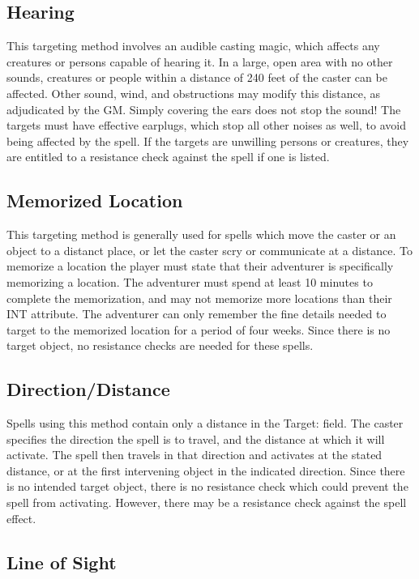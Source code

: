 \begin{multicols*}{2}
\subsection{Hearing}

This targeting method involves an audible casting magic, which affects any creatures or persons capable of hearing it. In a large, open area with no other sounds,  creatures or people within a distance of 240 feet of the caster can be affected. Other sound, wind, and obstructions may modify this distance, as adjudicated by the GM. Simply covering the ears does not stop the sound! The targets must have effective earplugs, which stop all other noises as well, to avoid being affected by the spell. If the targets are unwilling persons or creatures, they are entitled to a resistance check against the spell if one is listed.
\subsection{Memorized Location}

This targeting method is generally used for spells which move the caster or an object to a distanct place, or let the caster scry or communicate at a distance. To memorize a location the player must state that their adventurer is specifically memorizing a location. The adventurer must spend at least 10 minutes to complete the memorization, and may not memorize more locations than their INT attribute. The adventurer can only remember the fine details needed to target to the memorized location for a period of four weeks. Since there is no target object, no resistance checks are needed for these spells.
\subsection{Direction/Distance}

Spells using this method contain only a distance in the Target: field. The caster specifies the direction the spell is to travel, and the distance at which it will activate. The spell then travels in that direction and activates at the stated distance, or at the first intervening object in the indicated direction. Since there is no intended target object, there is no resistance check which could prevent the spell from activating. However, there may be a resistance check against the spell effect.
\subsection{Line of Sight}


\end{multicols*}
